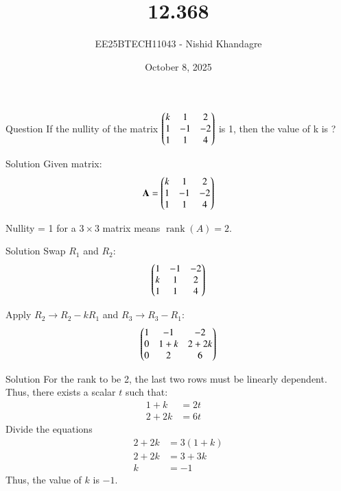 \documentclass{beamer}
\title
{12.368}
\date{October 8, 2025}
\author
{EE25BTECH11043 - Nishid Khandagre}
\begin{document}
\frame{\titlepage}

\begin{frame}{Question}
If the nullity of the matrix
$\begin{pmatrix}k & 1 & 2 \\ 1 & -1 & -2 \\ 1 & 1 & 4\end{pmatrix}$
is 1, then the value of k is ?
\end{frame}

\begin{frame}{Solution}
Given matrix:
\begin{align}
\mathbf{A}=\begin{pmatrix}k & 1 & 2 \\ 1 & -1 & -2 \\ 1 & 1 & 4\end{pmatrix}
\end{align}



Nullity = 1 for a $3 \times 3$ matrix means $\operatorname{rank}(A)=2$.
\end{frame}

\begin{frame}{Solution}
Swap $R_1$ and $R_2$:
\begin{align}
\begin{pmatrix}1 & -1 & -2 \\ k & 1 & 2 \\ 1 & 1 & 4\end{pmatrix}
\end{align}

Apply $R_2 \rightarrow R_2 - kR_1$ and $R_3 \rightarrow R_3 - R_1$:
\begin{align}
\begin{pmatrix}1 & -1 & -2 \\ 0 & 1+k & 2+2k \\ 0 & 2 & 6\end{pmatrix}
\end{align}
\end{frame}

\begin{frame}{Solution}
For the rank to be 2, the last two rows must be linearly dependent.
Thus, there exists a scalar $t$ such that:
\begin{align}
1+k &= 2t \quad \label{eq:1} \\
2+2k &= 6t \quad \label{eq:2}
\end{align}
Divide the equations
\begin{align}
2+2k &= 3(1+k) \\
2+2k &= 3+3k\\
k &= -1
\end{align}
Thus, the value of $k$ is $-1$.
\end{frame}
\end{document}
